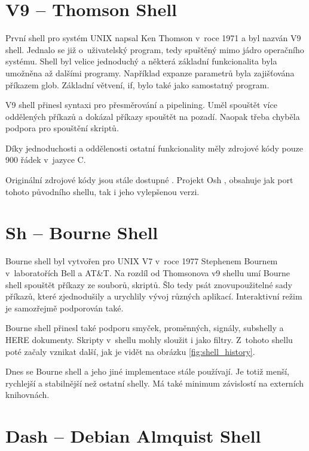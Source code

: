 \documentclass[thesis=M,czech]{FITthesis}[2012/06/26]
\begin{document}
\section{V9 -- Thomson Shell}

První shell pro systém UNIX napsal Ken Thomson v~roce 1971 a byl nazván V9 shell. Jednalo se již o~uživatelský program, tedy spuštěný mimo jádro operačního systému. Shell byl velice jednoduchý a některá základní funkcionalita byla umožněna až dalšími programy. Například expanze parametrů byla zajišťována příkazem glob. Základní větvení, if, bylo také jako samostatný program.

V9 shell přinesl syntaxi pro přesměrování a pipelining. Uměl spouštět více oddělených příkazů a dokázal příkazy spouštět na pozadí. Naopak třeba chyběla podpora pro spouštění skriptů.

Díky jednoduchosti a oddělenosti ostatní funkcionality měly zdrojové kódy pouze 900 řádek v~jazyce C.

Originální zdrojové kódy jsou stále dostupné \cite{thompsonshell}. Projekt Osh \cite{v6shell}, obsahuje jak port tohoto původního shellu, tak i jeho vylepšenou verzi.



%
%
%
\section{Sh -- Bourne Shell}

Bourne shell byl vytvořen pro UNIX V7 v~roce 1977 Stephenem Bournem v~laboratořích Bell a AT\&T. Na rozdíl od Thomsonova v9 shellu umí Bourne shell spouštět příkazy ze souborů, skriptů. Šlo tedy psát znovupoužitelné sady příkazů, které zjednodušily a urychlily vývoj různých aplikací. Interaktivní režim je samozřejmě podporován také.

Bourne shell přinesl také podporu smyček, proměnných, signály, subshelly a HERE dokumenty. Skripty v~shellu mohly sloužit i jako filtry. Z~tohoto shellu poté začaly vznikat další, jak je vidět na obrázku \ref{fig:shell_history}.

Dnes se Bourne shell a jeho jiné implementace stále používají. Je totiž menší, rychlejší a stabilnější než ostatní shelly. Má také minimum závislostí na externích knihovnách.

%
%
%
\section{Dash -- Debian Almquist Shell}
\end{document}
